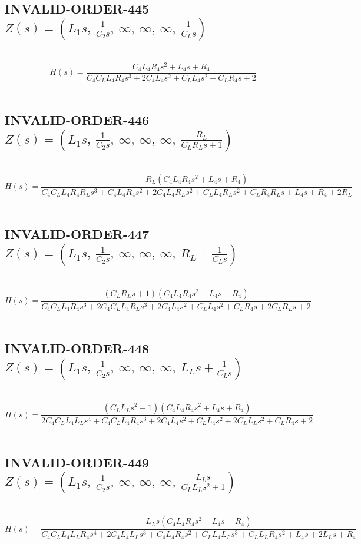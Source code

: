 \documentclass{article}
\begin{document}
\subsection{INVALID-ORDER-445 $Z(s) = \left( L_{1} s, \  \frac{1}{C_{2} s}, \  \infty, \  \infty, \  \infty, \  \frac{1}{C_{L} s}\right)$ } \ 
\textbf{\[H(s) = \frac{C_{4} L_{4} R_{4} s^{2} + L_{4} s + R_{4}}{C_{4} C_{L} L_{4} R_{4} s^{3} + 2 C_{4} L_{4} s^{2} + C_{L} L_{4} s^{2} + C_{L} R_{4} s + 2}\] } \ 
\subsection{INVALID-ORDER-446 $Z(s) = \left( L_{1} s, \  \frac{1}{C_{2} s}, \  \infty, \  \infty, \  \infty, \  \frac{R_{L}}{C_{L} R_{L} s + 1}\right)$ } \ 
\textbf{\[H(s) = \frac{R_{L} \left(C_{4} L_{4} R_{4} s^{2} + L_{4} s + R_{4}\right)}{C_{4} C_{L} L_{4} R_{4} R_{L} s^{3} + C_{4} L_{4} R_{4} s^{2} + 2 C_{4} L_{4} R_{L} s^{2} + C_{L} L_{4} R_{L} s^{2} + C_{L} R_{4} R_{L} s + L_{4} s + R_{4} + 2 R_{L}}\] } \ 
\subsection{INVALID-ORDER-447 $Z(s) = \left( L_{1} s, \  \frac{1}{C_{2} s}, \  \infty, \  \infty, \  \infty, \  R_{L} + \frac{1}{C_{L} s}\right)$ } \ 
\textbf{\[H(s) = \frac{\left(C_{L} R_{L} s + 1\right) \left(C_{4} L_{4} R_{4} s^{2} + L_{4} s + R_{4}\right)}{C_{4} C_{L} L_{4} R_{4} s^{3} + 2 C_{4} C_{L} L_{4} R_{L} s^{3} + 2 C_{4} L_{4} s^{2} + C_{L} L_{4} s^{2} + C_{L} R_{4} s + 2 C_{L} R_{L} s + 2}\] } \ 
\subsection{INVALID-ORDER-448 $Z(s) = \left( L_{1} s, \  \frac{1}{C_{2} s}, \  \infty, \  \infty, \  \infty, \  L_{L} s + \frac{1}{C_{L} s}\right)$ } \ 
\textbf{\[H(s) = \frac{\left(C_{L} L_{L} s^{2} + 1\right) \left(C_{4} L_{4} R_{4} s^{2} + L_{4} s + R_{4}\right)}{2 C_{4} C_{L} L_{4} L_{L} s^{4} + C_{4} C_{L} L_{4} R_{4} s^{3} + 2 C_{4} L_{4} s^{2} + C_{L} L_{4} s^{2} + 2 C_{L} L_{L} s^{2} + C_{L} R_{4} s + 2}\] } \ 
\subsection{INVALID-ORDER-449 $Z(s) = \left( L_{1} s, \  \frac{1}{C_{2} s}, \  \infty, \  \infty, \  \infty, \  \frac{L_{L} s}{C_{L} L_{L} s^{2} + 1}\right)$ } \ 
\textbf{\[H(s) = \frac{L_{L} s \left(C_{4} L_{4} R_{4} s^{2} + L_{4} s + R_{4}\right)}{C_{4} C_{L} L_{4} L_{L} R_{4} s^{4} + 2 C_{4} L_{4} L_{L} s^{3} + C_{4} L_{4} R_{4} s^{2} + C_{L} L_{4} L_{L} s^{3} + C_{L} L_{L} R_{4} s^{2} + L_{4} s + 2 L_{L} s + R_{4}}\] } \ 
\end{document}
